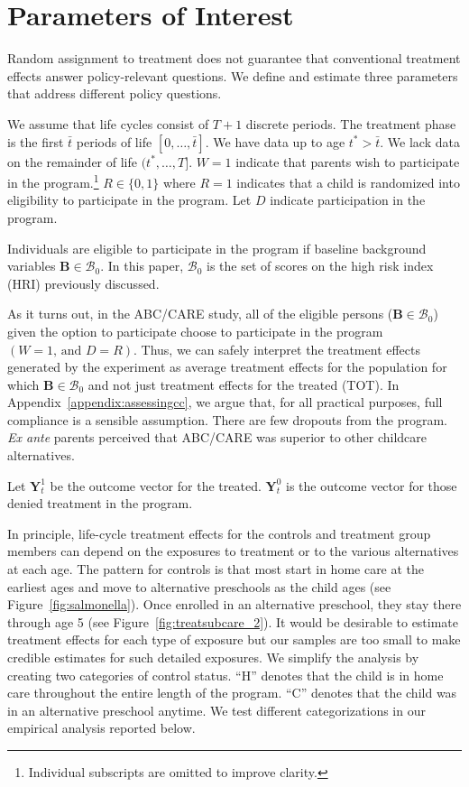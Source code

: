 \section{Parameters of Interest} \label{section:methodsquestions}

Random assignment to treatment does not guarantee that conventional treatment effects answer policy-relevant questions. We define and estimate three parameters that address different policy questions.

We assume that life cycles consist of $T+1$ discrete periods. The treatment phase is the first $\bar{t}$ periods of life $\left[0,\dots,\bar{t}\right]$. We have data up to age $t^{*}>\bar{t}$. We lack data on the remainder of life $(t^*,\dots,T]$. $W=1$ indicate that parents wish to participate in the program.\footnote{Individual subscripts are omitted to improve clarity.} $R \in \{0,1\}$ where $R=1$ indicates that a child is randomized into eligibility to participate in the program. Let $D$ indicate participation in the program.

Individuals are eligible to participate in the program if baseline background variables $\bm{B}\in\mathcal{B}_0$. In this paper, $\mathcal{B}_0$ is the set of scores on the high risk index (HRI) previously discussed. 

As it turns out, in the ABC/CARE study, all of the eligible persons ($\bm{B}\in\mathcal{B}_0$) given the option to participate choose to participate in the program $(W=1\text{, and } D=R)$. Thus, we can safely interpret the treatment effects generated by the experiment as average treatment effects for the population for which $\bm{B}\in\mathcal{B}_0$ and not just treatment effects for the treated (TOT). In Appendix~\ref{appendix:assessingcc}, we argue that, for all practical purposes, full compliance is a sensible assumption. There are few dropouts from the program. \emph{Ex ante} parents perceived that ABC/CARE was superior to other childcare alternatives.

Let $\bm{Y}^1_t$ be the outcome vector for the treated. $\bm{Y}^0_t$ is the outcome vector for those denied treatment in the program.

In principle, life-cycle treatment effects for the controls and treatment group members can depend on the exposures to treatment or to the various alternatives at each age. The pattern for controls is that most start in home care at the earliest ages and move to alternative preschools as the child ages (see Figure~\ref{fig:salmonella}). Once enrolled in an alternative preschool, they stay there through age 5 (see Figure~\ref{fig:treatsubcare_2}). It would be desirable to estimate treatment effects for each type of exposure but our samples are too small to make credible estimates for such detailed exposures. We simplify the analysis by creating two categories of control status. ``H'' denotes that the child is in home care throughout the entire length of the program. ``C'' denotes that the child was in an alternative preschool anytime. We test different categorizations in our empirical analysis reported below.

